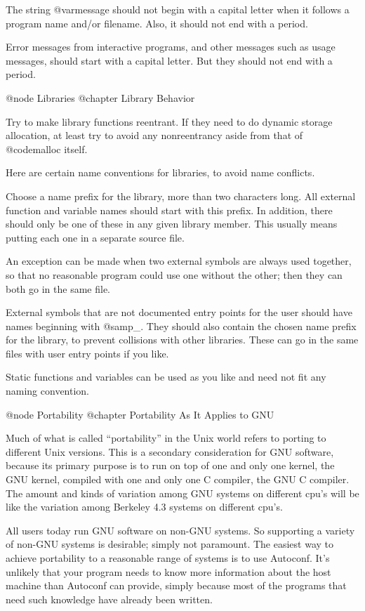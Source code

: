 The string @var{message} should not begin with a capital letter when
it follows a program name and/or filename.  Also, it should not end
with a period.

Error messages from interactive programs, and other messages such as
usage messages, should start with a capital letter.  But they should not
end with a period.


@node Libraries
@chapter Library Behavior

Try to make library functions reentrant.  If they need to do dynamic
storage allocation, at least try to avoid any nonreentrancy aside from
that of @code{malloc} itself.

Here are certain name conventions for libraries, to avoid name
conflicts.

Choose a name prefix for the library, more than two characters long.
All external function and variable names should start with this
prefix.  In addition, there should only be one of these in any given
library member.  This usually means putting each one in a separate
source file.

An exception can be made when two external symbols are always used
together, so that no reasonable program could use one without the
other; then they can both go in the same file.

External symbols that are not documented entry points for the user
should have names beginning with @samp{_}.  They should also contain
the chosen name prefix for the library, to prevent collisions with
other libraries.  These can go in the same files with user entry
points if you like.

Static functions and variables can be used as you like and need not
fit any naming convention.


@node Portability
@chapter Portability As It Applies to GNU

Much of what is called ``portability'' in the Unix world refers to
porting to different Unix versions.  This is a secondary consideration
for GNU software, because its primary purpose is to run on top of one
and only one kernel, the GNU kernel, compiled with one and only one C
compiler, the GNU C compiler.  The amount and kinds of variation among
GNU systems on different cpu's will be like the variation among Berkeley
4.3 systems on different cpu's.

All users today run GNU software on non-GNU systems.  So supporting a
variety of non-GNU systems is desirable; simply not paramount.
The easiest way to achieve portability to a reasonable range of systems
is to use Autoconf.  It's unlikely that your program needs to know more
information about the host machine than Autoconf can provide, simply
because most of the programs that need such knowledge have already been
written.

